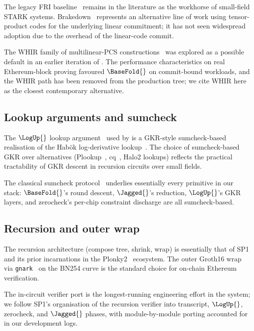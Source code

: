 The legacy FRI baseline~\citep{ben2018fast} remains in the literature as the workhorse of small-field STARK systems. Brakedown~\citep{brakedown} represents an alternative line of work using tensor-product codes for the underlying linear commitment; it has not seen widespread \zkVM{} adoption due to the overhead of the linear-code commit.

The WHIR family of multilinear-PCS constructions~\citep{whir} was explored as a possible default in an earlier iteration of \Ziren{}. The performance characteristics on real Ethereum-block proving favoured $\BaseFold{}$ on commit-bound workloads, and the WHIR path has been removed from the production tree; we cite WHIR here as the closest contemporary alternative.

\subsection{Lookup arguments and sumcheck}

The $\LogUp{}$ lookup argument~\citep{logup-gkr} used by \Zirenver{} is a GKR-style sumcheck-based realisation of the Habök log-derivative lookup~\citep{haboeck}. The choice of sumcheck-based GKR over alternatives (Plookup~\citep{plookup}, cq~\citep{cq}, Halo2 lookups) reflects the practical tractability of GKR descent in recursion circuits over small fields.

The classical sumcheck protocol~\citep{lund1992algebraic} underlies essentially every primitive in our stack: $\BaseFold{}$'s round descent, $\Jagged{}$'s reduction, $\LogUp{}$'s GKR layers, and zerocheck's per-chip constraint discharge are all sumcheck-based.

\subsection{Recursion and outer wrap}

The recursion architecture (compose tree, shrink, wrap) is essentially that of SP1 and its prior incarnations in the Plonky2~\citep{plonky2} ecosystem. The outer Groth16 wrap via \texttt{gnark}~\citep{gnark} on the BN254 curve is the standard choice for on-chain Ethereum verification.

The in-circuit verifier port is the longest-running engineering effort in the system; we follow SP1's organisation of the recursion verifier into transcript, $\LogUp{}$, zerocheck, and $\Jagged{}$ phases, with module-by-module porting accounted for in our development logs.

